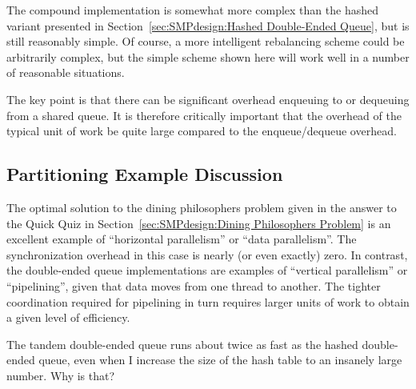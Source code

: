 The compound implementation is somewhat more complex than the
hashed variant presented in
Section~\ref{sec:SMPdesign:Hashed Double-Ended Queue},
but is still reasonably simple.
Of course, a more intelligent rebalancing scheme could be arbitrarily
complex, but the simple scheme shown here will work well in a number
of reasonable situations.

The key point is that there can be significant overhead enqueuing to
or dequeuing from a shared queue.
It is therefore critically important that the overhead of the typical
unit of work be quite large compared to the enqueue/dequeue overhead.

\subsection{Partitioning Example Discussion}
\label{sec:SMPdesign:Partitioning Example Discussion}

The optimal solution to the dining philosophers problem given in
the answer to the Quick Quiz in
Section~\ref{sec:SMPdesign:Dining Philosophers Problem}
is an excellent example of ``horizontal parallelism'' or
``data parallelism''.
The synchronization overhead in this case is nearly (or even exactly)
zero.
In contrast, the double-ended
queue implementations are examples of ``vertical parallelism'' or
``pipelining'', given that data moves from one thread to another.
The tighter coordination required for pipelining in turn requires
larger units of work to obtain a given level of efficiency.

\QuickQuiz{}
	The tandem double-ended queue runs about twice as fast as
	the hashed double-ended queue, even when I increase the
	size of the hash table to an insanely large number.
	Why is that?
 \QuickQuizEnd

